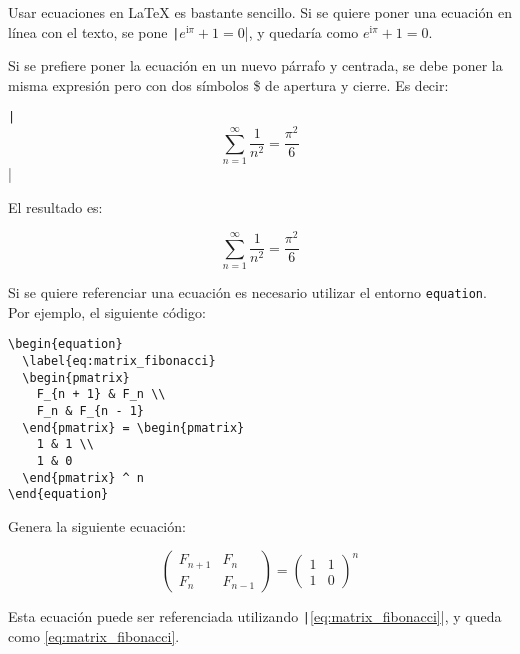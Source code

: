 \documentclass[../../main.tex]{subfile}
\begin{document}
  Usar ecuaciones en LaTeX es bastante sencillo. Si se quiere poner una ecuación en línea con el texto, se pone \texttt|$e^{\mathrm{i}\pi} + 1 = 0$|, y quedaría como $e^{\mathrm{i}\pi} + 1 = 0$.

  Si se prefiere poner la ecuación en un nuevo párrafo y centrada, se debe poner la misma expresión pero con dos símbolos \$ de apertura y cierre. Es decir: 
  
  \texttt|$$\sum_{n = 1}^\infty \frac{1}{n^2} = \frac{\pi^2}{6}$$|
  
  El resultado es:

  $$
  \sum_{n = 1}^\infty \frac{1}{n^2} = \frac{\pi^2}{6}
  $$

  Si se quiere referenciar una ecuación es necesario utilizar el entorno \texttt{equation}. Por ejemplo, el siguiente código:

  \begin{verbatim}
\begin{equation}
  \label{eq:matrix_fibonacci}
  \begin{pmatrix}
    F_{n + 1} & F_n \\
    F_n & F_{n - 1}
  \end{pmatrix} = \begin{pmatrix}
    1 & 1 \\
    1 & 0
  \end{pmatrix} ^ n
\end{equation}
  \end{verbatim}

  Genera la siguiente ecuación:

  \begin{equation}
    \label{eq:matrix_fibonacci}
    \begin{pmatrix}
      F_{n + 1} & F_n \\
      F_n & F_{n - 1}
    \end{pmatrix} = \begin{pmatrix}
      1 & 1 \\
      1 & 0
    \end{pmatrix} ^ n
  \end{equation}

  Esta ecuación puede ser referenciada utilizando \texttt|\eqref{eq:matrix_fibonacci}|, y queda como \eqref{eq:matrix_fibonacci}.
\end{document}
